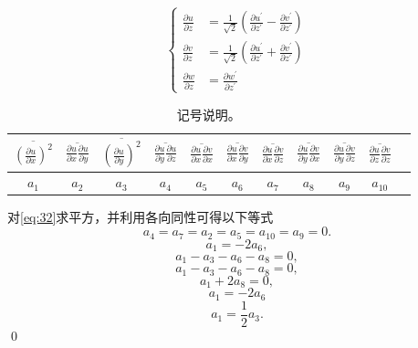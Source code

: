 \documentclass[12pt,a4]{ctexart}
\begin{document}
\begin{equation}
   \begin{cases}
      \frac{\partial u}{\partial z} & =\frac{1}{\sqrt{2}}\left(\frac{\partial u^{\prime}}{\partial z^{\prime}}-\frac{\partial v^{\prime}}{\partial z^{\prime}}\right) \\
      \frac{\partial v}{\partial z} & =\frac{1}{\sqrt{2}}\left(\frac{\partial u^{\prime}}{\partial z^{\prime}}+\frac{\partial v^{\prime}}{\partial z^{\prime}}\right) \\
      \frac{\partial w}{\partial z} & =\frac{\partial w^{\prime}}{\partial z^{\prime}}
   \end{cases}
\end{equation}

\begin{table}[htpb]
   \centering
   \caption{记号说明。}
   \label{tab:31}
   \begin{tabular}{ccccccccccc}
      \toprule
      $\overline{\left(\frac{\partial u}{\partial x}\right)^{2}}$
       & $\overline{ \frac{\partial u}{\partial x} \frac{\partial u}{\partial y} }$
       & $\overline{{\left(\frac{\partial u}{\partial y}\right)}^{2} }$
       & $\overline{  \frac{\partial u}{\partial y} \frac{\partial u}{\partial z} }$
       & $\overline{ \frac{\partial u}{\partial x} \frac{\partial v}{\partial x} }$
       & $ \overline{\frac{\partial u}{\partial x} \frac{\partial v}{\partial y}} $
       & $ \overline{\frac{\partial u}{\partial x} \frac{\partial v}{\partial z}}$
       & $\overline{ \frac{\partial u}{\partial y} \frac{\partial v}{\partial x} }$
       & $\overline{ \frac{\partial u}{\partial y} \frac{\partial v}{\partial z} }$
       & $\overline{ \frac{\partial u}{\partial z} \frac{\partial v}{\partial z}}$   \\
      \midrule
      $a_{1} $
       & $ a_{2} $
       & $ a_{3} $
       & $ a_{4} $
       & $ a_{5} $
       & $ a_{6} $
       & $ a_{7} $
       & $ a_{8} $
       & $ a_{9} $
       & $ a_{10}$                                                                   \\
      \bottomrule
   \end{tabular}
\end{table}
对\cref{eq:32}求平方，并利用各向同性可得以下等式
\begin{equation}
   a_4 = a_7 = a_2 = a_5 = a_{10} = a_9 = 0.
\end{equation}
\begin{equation}
   a_1 = - 2a_6,
\end{equation}
\begin{equation}
   a_1 - a_3 - a_6 - a_8 = 0,
\end{equation}
\begin{equation}
   a_1 - a_3 - a_6 - a_8 = 0,
\end{equation}
\begin{equation}
   a_1 + 2a_8 = 0,
\end{equation}
\begin{equation}
   a_1 = - 2a_6
\end{equation}
\begin{equation}
   a_1 = \frac{1}{2} a_3.
\end{equation}
\qed
\end{document}
